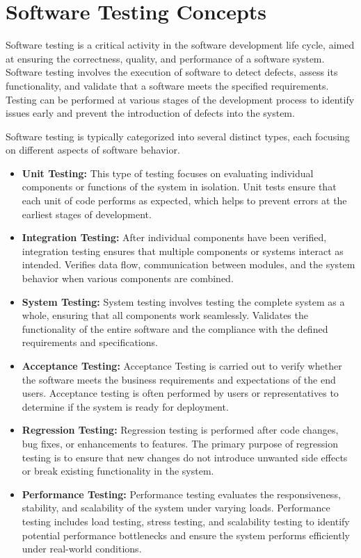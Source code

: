 \section{Software Testing Concepts}

Software testing is a critical activity in the software development life cycle, aimed at ensuring the correctness, quality, and performance of a software system. Software testing involves the execution of software to detect defects, assess its functionality, and validate that a software meets the specified requirements. Testing can be performed at various stages of the development process to identify issues early and prevent the introduction of defects into the system.

Software testing is typically categorized into several distinct types, each focusing on different aspects of software behavior.

\begin{itemize}
    \item \textbf{Unit Testing:} This type of testing focuses on evaluating individual components or functions of the system in isolation. Unit tests ensure that each unit of code performs as expected, which helps to prevent errors at the earliest stages of development.
    \item \textbf{Integration Testing:} After individual components have been verified, integration testing ensures that multiple components or systems interact as intended. Verifies data flow, communication between modules, and the system behavior when various components are combined.
    \item \textbf{System Testing:} System testing involves testing the complete system as a whole, ensuring that all components work seamlessly. Validates the functionality of the entire software and the compliance with the defined requirements and specifications.
    \item \textbf{Acceptance Testing:} Acceptance Testing is carried out to verify whether the software meets the business requirements and expectations of the end users. Acceptance testing is often performed by users or representatives to determine if the system is ready for deployment.
    \item \textbf{Regression Testing:} Regression testing is performed after code changes, bug fixes, or enhancements to features. The primary purpose of regression testing is to ensure that new changes do not introduce unwanted side effects or break existing functionality in the system.
    \item \textbf{Performance Testing:} Performance testing evaluates the responsiveness, stability, and scalability of the system under varying loads. Performance testing includes load testing, stress testing, and scalability testing to identify potential performance bottlenecks and ensure the system performs efficiently under real-world conditions.
\end{itemize}

